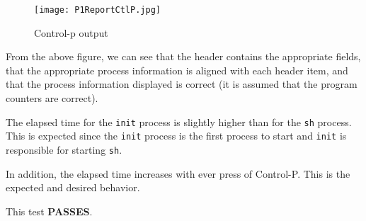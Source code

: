 \documentclass[11pt,letterpaper]{report}
\begin{document}
{  \begin{figure}[h!]
    \centering
    \texttt{[image: P1ReportCtlP.jpg]}
    \caption[Control-P output]{Control-p output}
    \label{fig:cpout}
  \end{figure}

  From the above figure, we can see that the header contains the appropriate
  fields, that the appropriate process information is aligned with each header
  item, and that the process information displayed is correct (it is assumed
  that the program counters are correct).

  The elapsed time for the {\tt init} process is slightly higher than for the
  {\tt sh} process. This is expected since the {\tt init} process is the first
  process to start and {\tt init} is responsible for starting {\tt sh}.

  In addition, the elapsed time increases with ever press of Control-P. This is
  the expected and desired behavior.

  This test \textbf{PASSES}.

\ifdefined \LF
} %
\fi
\end{document}
